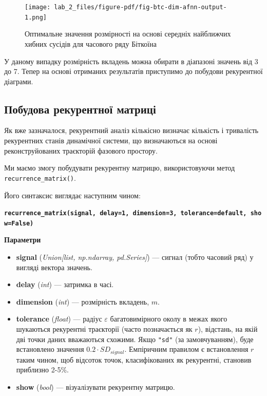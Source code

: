 \documentclass[
  letterpaper,
]{report}
\providecommand{\tightlist}{%
  \setlength{\itemsep}{0pt}\setlength{\parskip}{0pt}}\usepackage{longtable,booktabs,array}
\begin{document}
\begin{figure}[H]

{\centering \texttt{[image: lab\_2\_files/figure-pdf/fig-btc-dim-afnn-output-1.png]}

}

\caption{\label{fig-btc-dim-afnn}Оптимальне значення розмірності на
основі середніх найближчих хибних сусідів для часового ряду Біткоїна}

\end{figure}

У даному випадку розмірність вкладень можна обирати в діапазоні значень
від 3 до 7. Тепер на основі отриманих результатів приступимо до побудови
рекурентної діаграми.

\hypertarget{ux43fux43eux431ux443ux434ux43eux432ux430-ux440ux435ux43aux443ux440ux435ux43dux442ux43dux43eux457-ux43cux430ux442ux440ux438ux446ux456}{%
\subsection{Побудова рекурентної
матриці}\label{ux43fux43eux431ux443ux434ux43eux432ux430-ux440ux435ux43aux443ux440ux435ux43dux442ux43dux43eux457-ux43cux430ux442ux440ux438ux446ux456}}

Як вже зазначалося, рекурентний аналіз кількісно визначає кількість і
тривалість рекурентних станів динамічної системи, що визначаються на
основі реконструйованих траєкторій фазового простору.

Ми маємо змогу побудувати рекурентну матрицю, використовуючи метод
\texttt{recurrence\_matrix()}.

Його синтаксис виглядає наступним чином:

\textbf{\texttt{recurrence\_matrix(signal,\ delay=1,\ dimension=3,\ tolerance=\textquotesingle{}default\textquotesingle{},\ show=False)}}

\textbf{Параметри}

\begin{itemize}
\tightlist
\item
  \textbf{signal} (\emph{Union{[}list, np.ndarray, pd.Series{]}}) ---
  сигнал (тобто часовий ряд) у вигляді вектора значень.
\item
  \textbf{delay} (\emph{int}) --- затримка в часі.
\item
  \textbf{dimension} (\emph{int}) --- розмірність вкладень, \(m\).
\item
  \textbf{tolerance} (\emph{float}) --- радіус \(\varepsilon\)
  багатовимірного околу в межах якого шукаються рекурентні траєкторії
  (часто позначається як \(r\)), відстань, на якій дві точки даних
  вважаються схожими. Якщо \texttt{"sd"} (за замовчуванням), буде
  встановлено значення \(0.2 \cdot SD_{signal}\). Емпіричним правилом є
  встановлення \(r\) таким чином, щоб відсоток точок, класифікованих як
  рекурентні, становив приблизно 2-5\%.
\item
  \textbf{show} (\emph{bool}) --- візуалізувати рекурентну матрицю.
\end{itemize}
\end{document}
